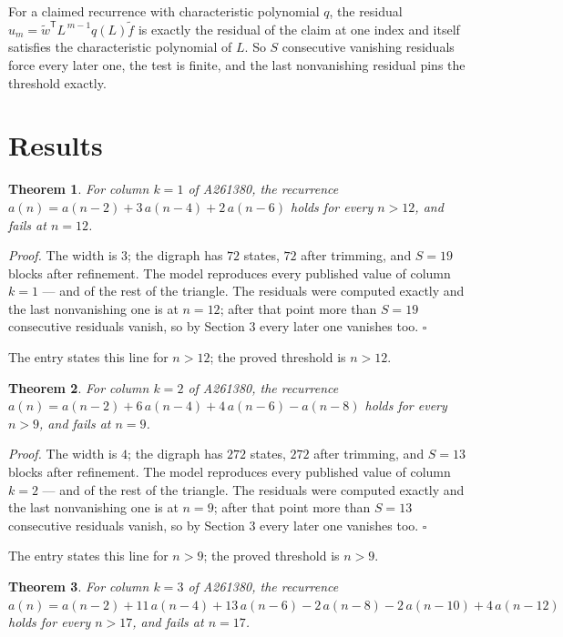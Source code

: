 \documentclass[11pt]{article}
\newtheorem{theorem}{Theorem}
\theoremstyle{definition}
\begin{document}
For a claimed recurrence with characteristic polynomial $q$, the residual $u_m = \tilde w^{\mathsf T}L^{\,m-1}q(L)\tilde f$ is exactly the residual of the claim at one index and itself satisfies the characteristic polynomial of $L$. So $S$ consecutive vanishing residuals force every later one, the test is finite, and the last nonvanishing residual pins the threshold exactly.

\section{Results}

\begin{theorem} For column $k = 1$ of A261380, the recurrence $a(n) = a(n-2) + 3\,a(n-4) + 2\,a(n-6)$ holds for every $n > 12$, and fails at $n = 12$.\end{theorem}

{\itshape Proof.} The width is $3$; the digraph has $72$ states, $72$ after trimming, and $S = 19$ blocks after refinement. The model reproduces every published value of column $k = 1$ --- and of the rest of the triangle. The residuals were computed exactly and the last nonvanishing one is at $n = 12$; after that point more than $S = 19$ consecutive residuals vanish, so by Section 3 every later one vanishes too. $\square$

The entry states this line for $n > 12$; the proved threshold is $n > 12$.

\begin{theorem} For column $k = 2$ of A261380, the recurrence $a(n) = a(n-2) + 6\,a(n-4) + 4\,a(n-6) - a(n-8)$ holds for every $n > 9$, and fails at $n = 9$.\end{theorem}

{\itshape Proof.} The width is $4$; the digraph has $272$ states, $272$ after trimming, and $S = 13$ blocks after refinement. The model reproduces every published value of column $k = 2$ --- and of the rest of the triangle. The residuals were computed exactly and the last nonvanishing one is at $n = 9$; after that point more than $S = 13$ consecutive residuals vanish, so by Section 3 every later one vanishes too. $\square$

The entry states this line for $n > 9$; the proved threshold is $n > 9$.

\begin{theorem} For column $k = 3$ of A261380, the recurrence $a(n) = a(n-2) + 11\,a(n-4) + 13\,a(n-6) - 2\,a(n-8) - 2\,a(n-10) + 4\,a(n-12)$ holds for every $n > 17$, and fails at $n = 17$.\end{theorem}
\end{document}
